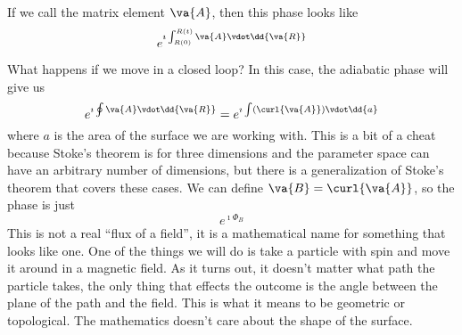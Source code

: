 \documentclass[a4paper,twoside,master.tex]{subfiles}
\begin{document}
If we call the matrix element $ \va{A} $, then this phase looks like
\begin{equation}
    e^{\imath \int_{R(0)}^{R(t)} \va{A} \vdot \dd{\va{R}}}
\end{equation}

What happens if we move in a closed loop? In this case, the adiabatic phase will give us
\begin{equation}
    e^{\imath \oint \va{A} \vdot \dd{\va{R}}} = e^{\imath \int \left( \curl{\va{A}} \right) \vdot \dd{a}}
\end{equation}
where $ a $ is the area of the surface we are working with. This is a bit of a cheat because Stoke's theorem is for three dimensions and the parameter space can have an arbitrary number of dimensions, but there is a generalization of Stoke's theorem that covers these cases. We can define $ \va{B} = \curl{\va{A}} $, so the phase is just
\begin{equation}
    e^{\imath \Phi_B}
\end{equation}
This is not a real ``flux of a field'', it is a mathematical name for something that looks like one. One of the things we will do is take a particle with spin and move it around in a magnetic field. As it turns out, it doesn't matter what path the particle takes, the only thing that effects the outcome is the angle between the plane of the path and the field. This is what it means to be geometric or topological. The mathematics doesn't care about the shape of the surface.
\end{document}
